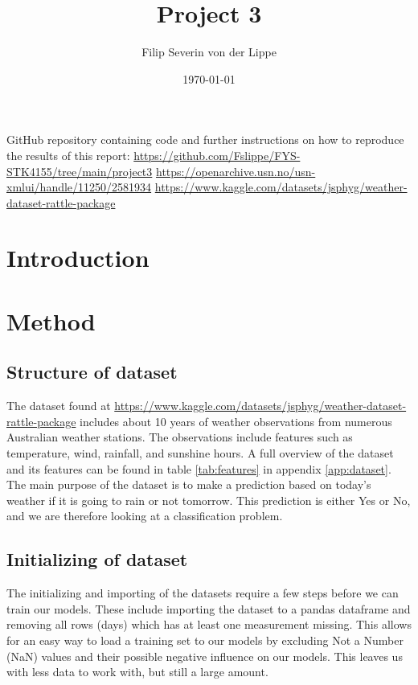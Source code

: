 \documentclass[11pt]{article}
\title{Project 3\\ }
\author{Filip Severin von der Lippe}
\date{\today}
\begin{document}
\maketitle
GitHub repository containing code and further instructions on how to reproduce the results of this report: \url{https://github.com/Fslippe/FYS-STK4155/tree/main/project3}
\url{https://openarchive.usn.no/usn-xmlui/handle/11250/2581934}
\url{https://www.kaggle.com/datasets/jsphyg/weather-dataset-rattle-package}
\begin{abstract}
\end{abstract}
\newpage
\tableofcontents
\newpage
\section{Introduction}
\section{Method}
\subsection{Structure of dataset} %
\label{sub:Structure of dataset}

The dataset found at \url{https://www.kaggle.com/datasets/jsphyg/weather-dataset-rattle-package} includes about 10 years of weather observations from numerous Australian weather stations. The observations include features such as temperature, wind, rainfall, and sunshine hours. A full overview of the dataset and its features can be found in table \ref{tab:features} in appendix \ref{app:dataset}. The main purpose of the dataset is to make a prediction based on today's weather if it is going to rain or not tomorrow. This prediction is either Yes or No, and we are therefore looking at a classification problem.



\subsection{Initializing of dataset}
The initializing and importing of the datasets require a few steps before we can train our models. These include importing the dataset to a pandas dataframe and removing all rows (days) which has at least one measurement missing. This allows for an easy way to load a training set to our models by excluding Not a Number (NaN) values and their possible negative influence on our models. This leaves us with less data to work with, but still a large amount.
\end{document}
